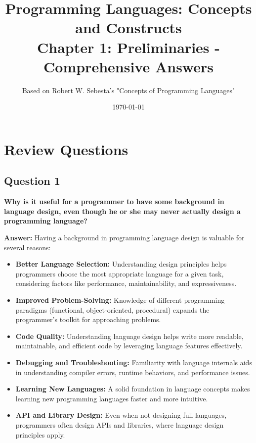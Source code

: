 \documentclass[11pt,a4paper]{article}
\title{\textbf{Programming Languages: Concepts and Constructs}\\
       \large Chapter 1: Preliminaries - Comprehensive Answers}
\author{Based on Robert W. Sebesta's "Concepts of Programming Languages"}
\date{\today}
\begin{document}
\maketitle

\tableofcontents
\newpage

\section{Review Questions}

\subsection{Question 1}
\textbf{Why is it useful for a programmer to have some background in language design, even though he or she may never actually design a programming language?}

\textbf{Answer:}
Having a background in programming language design is valuable for several reasons:

\begin{itemize}
\item \textbf{Better Language Selection:} Understanding design principles helps programmers choose the most appropriate language for a given task, considering factors like performance, maintainability, and expressiveness.

\item \textbf{Improved Problem-Solving:} Knowledge of different programming paradigms (functional, object-oriented, procedural) expands the programmer's toolkit for approaching problems.

\item \textbf{Code Quality:} Understanding language design helps write more readable, maintainable, and efficient code by leveraging language features effectively.

\item \textbf{Debugging and Troubleshooting:} Familiarity with language internals aids in understanding compiler errors, runtime behaviors, and performance issues.

\item \textbf{Learning New Languages:} A solid foundation in language concepts makes learning new programming languages faster and more intuitive.

\item \textbf{API and Library Design:} Even when not designing full languages, programmers often design APIs and libraries, where language design principles apply.
\end{itemize}
\end{document}
